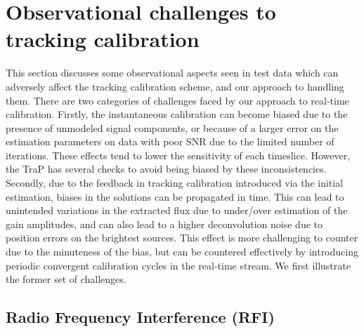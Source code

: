 \documentclass{aa}
\begin{document}
\section{\label{sec:Challenges-to-tracking}Observational challenges to tracking calibration}
This section  discusses some observational aspects  seen in test  data which can
adversely affect the  tracking calibration scheme, and our  approach to handling
them.  There are two categories of challenges faced by our approach to real-time
calibration. Firstly, the instantaneous calibration can become biased due to the
presence of  unmodeled signal components,  or because of  a larger error  on the
estimation  parameters on  data  with poor  SNR  due to  the  limited number  of
iterations.   These effects  tend to  lower the  sensitivity of  each timeslice.
However,  the  TraP   has  several  checks  to  avoid   being  biased  by  these
inconsistencies.   Secondly,  due  to   the  feedback  in  tracking  calibration
introduced via the initial estimation, biases in the solutions can be propagated
in time.   This can lead to unintended  variations in the extracted  flux due to
under/over estimation  of the  gain amplitudes,  and can also  lead to  a higher
deconvolution noise due to position errors on the brightest sources. This effect
is more  challenging to counter due  to the minuteness  of the bias, but  can be
countered effectively  by introducing periodic convergent  calibration cycles in
the real-time stream. We first illustrate the former set of challenges.

\subsection{Radio Frequency Interference (RFI)}
\end{document}
